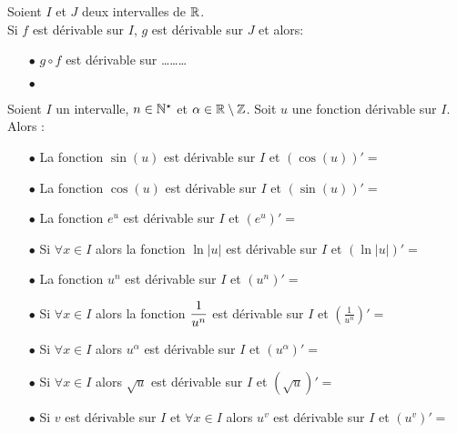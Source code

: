 \documentclass[a4paper, 11pt]{article}
\begin{document}
{\noindent

	\begin{prop}
		Soient $I$ et $J$ deux intervalles de $\mathbb{R}$. \\
		\noindent Si $f$ est d\'erivable sur $I$, $g$ est d\'erivable sur $J$ et \dotfill alors:\vsec
		\begin{itemize}
			\item[$\bullet$] $g \circ f$ est d\'erivable sur \ldots\ldots\ldots \vsec
			\item[$\bullet$] \dotfill \phantom{  \hspace{1cm}  }\vsec
		\end{itemize}
		\vsec
	\end{prop}
}

\begin{exemples} Soient $I$ un intervalle, $n\in\mathbb{N}^{\star}$ et $\alpha\in\mathbb{R}\setminus\mathbb{Z}$. Soit $u$ une fonction d\'erivable sur $I$. Alors : \vsec
	\begin{itemize}
		\item[$\bullet$] La fonction $\sin{(u)}$ est d\'erivable sur $I$ et $(\cos (u))'=$ \dotfill \vsec
		\item[$\bullet$] La fonction $\cos{(u)}$ est d\'erivable sur $I$ et $(\sin(u))'=$ \dotfill \vsec
		\item[$\bullet$] La fonction $e^{u}$ est d\'erivable sur $I$ et $(e^u)'=$ \dotfill \vsec
		\item[$\bullet$] Si $\forall x \in I$ \dotfill alors la fonction $\ln{{|u|}}$ est d\'erivable sur $I$ et $(\ln |u|)'= $ \dotfill  \vsec
		\item[$\bullet$] La fonction $u^n$ est d\'erivable sur $I$ et $(u^n)'=$ \dotfill \vsec
		\item[$\bullet$] Si $\forall x \in I$ \dotfill  alors la fonction $\displaystyle\frac{1}{u^n}$ est d\'erivable sur $I$ et $\left(\frac{1}{u^n}\right)'=$ \dotfill \vsec
		\item[$\bullet$] Si  $\forall x \in I$ \dotfill  alors $u^{\alpha}$ est d\'erivable sur $I$ et $(u^\alpha)'=$ \dotfill \vsec
		\item[$\bullet$] Si $\forall x \in I$ \dotfill  alors $\sqrt{u}$ est d\'erivable sur $I$ et $(\sqrt{u})'=$ \dotfill \vsec
		\item[$\bullet$] Si $v$ est d\'erivable sur $I$ et $\forall x \in I$ \dotfill  alors $u^v$ est d\'erivable sur $I$ et $(u^v)'=$ \dotfill \vsec
	\end{itemize}
\end{exemples}
\end{document}

